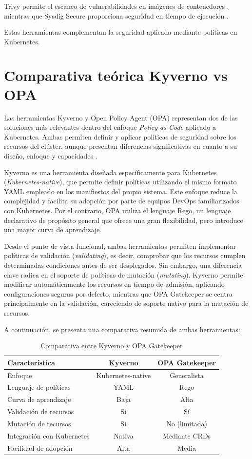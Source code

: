 Trivy permite el escaneo de vulnerabilidades en imágenes de contenedores \cite{trivy_docs}, mientras que Sysdig Secure proporciona seguridad en tiempo de ejecución \cite{sysdig_secure}.

Estas herramientas complementan la seguridad aplicada mediante políticas en Kubernetes.

\section{Comparativa teórica Kyverno vs OPA}

Las herramientas Kyverno y Open Policy Agent (OPA) representan dos de las soluciones más relevantes dentro del enfoque \textit{Policy-as-Code} aplicado a Kubernetes. Ambas permiten definir y aplicar políticas de seguridad sobre los recursos del clúster, aunque presentan diferencias significativas en cuanto a su diseño, enfoque y capacidades \cite{opa_docs, kyverno_docs}.

Kyverno es una herramienta diseñada específicamente para Kubernetes (\textit{Kubernetes-native}), que permite definir políticas utilizando el mismo formato YAML empleado en los manifiestos del propio sistema. Este enfoque reduce la complejidad y facilita su adopción por parte de equipos DevOps familiarizados con Kubernetes. Por el contrario, OPA utiliza el lenguaje Rego, un lenguaje declarativo de propósito general que ofrece una gran flexibilidad, pero introduce una mayor curva de aprendizaje.

Desde el punto de vista funcional, ambas herramientas permiten implementar políticas de validación (\textit{validating}), es decir, comprobar que los recursos cumplen determinadas condiciones antes de ser desplegados. Sin embargo, una diferencia clave radica en el soporte de políticas de mutación (\textit{mutating}). Kyverno permite modificar automáticamente los recursos en tiempo de admisión, aplicando configuraciones seguras por defecto, mientras que OPA Gatekeeper se centra principalmente en la validación, careciendo de soporte nativo para la mutación de recursos.

A continuación, se presenta una comparativa resumida de ambas herramientas:

\begin{table}[H]
\centering
\begin{tabular}{lcc}
\toprule
\textbf{Característica} & \textbf{Kyverno} & \textbf{OPA Gatekeeper} \\
\midrule
Enfoque & Kubernetes-native & Generalista \\
Lenguaje de políticas & YAML & Rego \\
Curva de aprendizaje & Baja & Alta \\
Validación de recursos & Sí & Sí \\
Mutación de recursos & Sí & No (limitada) \\
Integración con Kubernetes & Nativa & Mediante CRDs \\
Facilidad de adopción & Alta & Media \\
\bottomrule
\end{tabular}
\caption{Comparativa entre Kyverno y OPA Gatekeeper}
\label{tab:kyverno-vs-opa}
\end{table}


